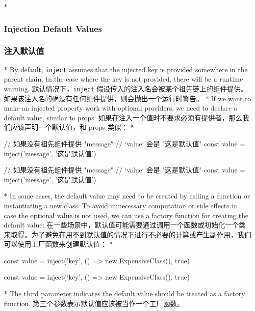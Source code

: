 \begin{paracol}{2}
\switchcolumn[0]*%
\subsubsection{Injection Default Values}
\switchcolumn
\subsubsection{注入默认值}
\switchcolumn[0]*%
By default, \texttt{inject} assumes that the injected key is provided
somewhere in the parent chain. In the case where the key is not
provided, there will be a runtime warning.
\switchcolumn
默认情况下，\texttt{inject}
假设传入的注入名会被某个祖先链上的组件提供。如果该注入名的确没有任何组件提供，则会抛出一个运行时警告。
\switchcolumn[0]*%
If we want to make an injected property work with optional providers, we
need to declare a default value, similar to props:
\switchcolumn
如果在注入一个值时不要求必须有提供者，那么我们应该声明一个默认值，和
props 类似：
\switchcolumn[0]*%
\begin{codeJs}
// 如果没有祖先组件提供 "message"
// `value` 会是 "这是默认值"
const value = inject('message', '这是默认值')
\end{codeJs}
\switchcolumn
\begin{codeJs}
// 如果没有祖先组件提供 "message"
// `value` 会是 "这是默认值"
const value = inject('message', '这是默认值')
\end{codeJs}
\switchcolumn[0]*%
In some cases, the default value may need to be created by calling a
function or instantiating a new class. To avoid unnecessary computation
or side effects in case the optional value is not used, we can use a
factory function for creating the default value:
\switchcolumn
在一些场景中，默认值可能需要通过调用一个函数或初始化一个类来取得。为了避免在用不到默认值的情况下进行不必要的计算或产生副作用，我们可以使用工厂函数来创建默认值：
\switchcolumn[0]*%
\begin{codeJs}
const value = inject('key', () => new ExpensiveClass(), true)
\end{codeJs}
\switchcolumn
\begin{codeJs}
const value = inject('key', () => new ExpensiveClass(), true)
\end{codeJs}
\switchcolumn[0]*%
The third parameter indicates the default value should be treated as a
factory function.
\switchcolumn
第三个参数表示默认值应该被当作一个工厂函数。
\end{paracol}

